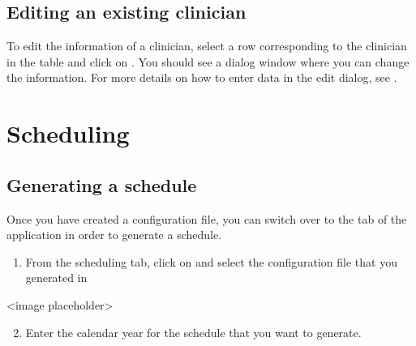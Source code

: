\documentclass[letterpaper,10pt,english]{sphinxmanual}
\begin{document}
\begin{figure}[htbp]
\centering
{}\end{figure}


\subsection{Editing an existing clinician}
\label{\detokenize{index:editing-an-existing-clinician}}
To edit the information of a clinician, select a row corresponding
to the clinician in the table and click on . You should
see a dialog window where you can change the information. For more
details on how to enter data in the edit dialog, see {\hyperref[\detokenize{index:adding-a-new-clinician}]{}}.

\begin{figure}[htbp]
\centering
{}\end{figure}


\section{Scheduling}
\label{\detokenize{index:scheduling}}

\subsection{Generating a schedule}
\label{\detokenize{index:generating-a-schedule}}\label{\detokenize{index:id5}}
Once you have created a configuration file, you can switch over to the
 tab of the application in order to generate a schedule.
\begin{enumerate}
\item {} 
From the scheduling tab, click on  and select the configuration
file that you generated in {\hyperref[\detokenize{index:clinician-configuration}]{}}

\end{enumerate}

\textless{}image placeholder\textgreater{}
\begin{enumerate}
\setcounter{enumi}{1}
\item {} 
Enter the calendar year for the schedule that you want to generate.

\end{enumerate}
\end{document}
